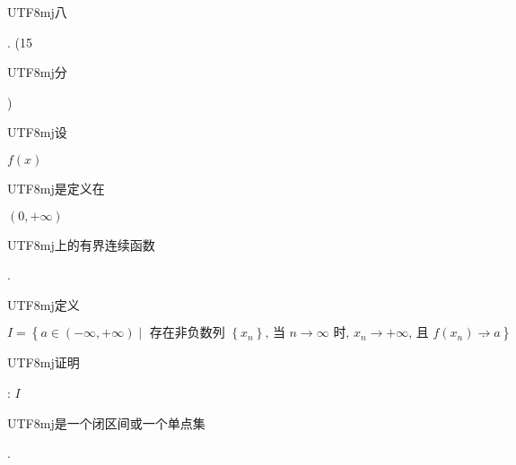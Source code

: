 \documentclass[10pt]{article}
\begin{document}
\begin{CJK}{UTF8}{mj}八\end{CJK}. (15 \begin{CJK}{UTF8}{mj}分\end{CJK}) \begin{CJK}{UTF8}{mj}设\end{CJK} $f(x)$ \begin{CJK}{UTF8}{mj}是定义在\end{CJK} $(0,+\infty)$ \begin{CJK}{UTF8}{mj}上的有界连续函数\end{CJK}. \begin{CJK}{UTF8}{mj}定义\end{CJK}
$$
I=\left\{a \in(-\infty,+\infty) \mid \text { 存在非负数列 }\left\{x_{n}\right\} \text {, 当 } n \rightarrow \infty \text { 时, } x_{n} \rightarrow+\infty \text {, 且 } f\left(x_{n}\right) \rightarrow a\right\} .
$$
\begin{CJK}{UTF8}{mj}证明\end{CJK}: $I$ \begin{CJK}{UTF8}{mj}是一个闭区间或一个单点集\end{CJK}.
\end{document}
